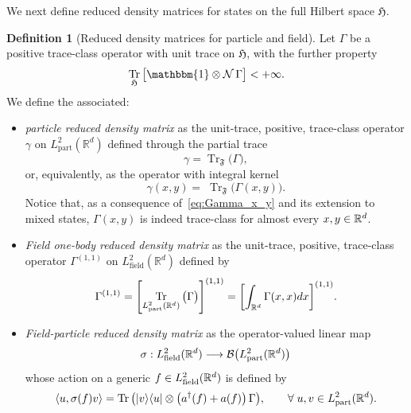 \documentclass[10pt]{amsart}
\theoremstyle{definition}\newtheorem{defi}[theo]{Definition}\newtheorem{rema}[theo]{Remark}\newtheorem{exam}[theo]{Example}\newtheorem{exem}[theo]{Example}\newtheorem{nota}[theo]{Notation}
\DeclareMathOperator{\Tr}{Tr}
\DeclareMathOperator{\partt}{part}
\DeclareMathOperator{\field}{field}
\newcommand{\R}{\mathbb{R}}
\newcommand{\cN}{\mathcal{N}}
\newcommand{\gH}{\mathfrak{H}}
\newcommand{\gF}{\mathfrak{F}}
\newcommand{\cB}{\mathcal{B}}
\newcommand{\1}{\mathds{1}}
\let\oldin\in
\renewcommand{\in}{\mathchoice{\oldin}{\oldin}{\,\oldin\,}{\,\oldin\,}}
\renewcommand*{\to}{\mathchoice{\longrightarrow}{\rightarrow}{\rightarrow}{\rightarrow}}
\let\originalleft\left
\let\originalright\right
\renewcommand{\left}{\mathopen{}\mathclose\bgroup\originalleft}
\renewcommand{\right}{\aftergroup\egroup\originalright}
\let\oldforall\forall
\renewcommand*{\forall}{\mathrel{\oldforall}}
\begin{document}
We next define reduced density matrices for states on the full Hilbert space $ \gH$.

\begin{defi}[{Reduced density matrices for particle and field}]\label{def:reduced_densities}
Let $\Gamma$ be a positive trace-class operator with unit trace on $ \gH$, with the further property
\begin{equation*}
\Tr_{ \gH} \big[\mathbbm{1}\otimes \cN\,\Gamma\big]<+\infty.
\end{equation*}
We define the associated:
\begin{itemize}
\item \emph{particle reduced density matrix} as the unit-trace, positive, trace-class operator $\gamma$ on $L^2_{\partt}(\R^d)$ defined through the partial trace
\begin{equation}
\gamma=\Tr_{\gF}\big(\Gamma\big),
\end{equation}
or, equivalently, as the operator with integral kernel
\begin{equation}
\gamma(x,y)=\;\Tr_{\gF}\big(\Gamma(x,y)\big).
\end{equation}
Notice that, as a consequence of~\eqref{eq:Gamma_x_y} and its extension to mixed states, $\Gamma(x,y)$ is indeed trace-class for almost every $x,y\in\R^d$.
\item \emph{Field one-body reduced density matrix} as the unit-trace, positive, trace-class operator $\Gamma^{(1,1)}$ on $L^2_{\field}(\R^d)$ defined by
\begin{equation}\label{eq:def_rho_field}
\Gamma^{(1,1)}= \left[\Tr_{L^2_{\partt}(\R^d)}\big(\Gamma\big)\right]^{(1,1)}=\left[\int_{\R^d}\Gamma(x,x) dx\right]^{(1,1)}.
\end{equation}
\item \emph{Field-particle reduced density matrix} as the operator-valued linear map
\begin{equation*}
\sigma: L^2_{\field}(\R^d)\to \cB \left(L^2_{\partt}(\R^d)\right)
\end{equation*}
whose action on a generic $f\in L^2_{\field}(\R^d)$ is defined by
\begin{equation}
\left\langle u, \sigma(f) v\right\rangle=\Tr\big(|v\rangle \langle u| \otimes \left(a^\dagger(f) + a (f) \right)\,\Gamma\big),\qquad\forall u,v\in L^2_{\partt}(\R^d).
\end{equation}
\end{itemize}
\end{defi}
\end{document}
